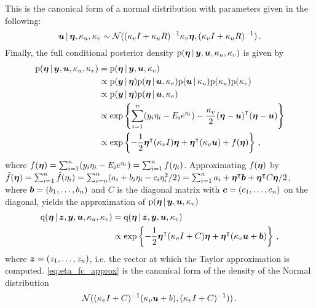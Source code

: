 %
This is the canonical form of a normal distribution with parameters given in the following:
%
\begin{equation*}
    \bm{u} \, | \, \bm{\eta}, \kappa_u, \kappa_v \sim \mathcal{N} ((\kappa_v I + \kappa_u R)^{-1} \kappa_v \bm{\eta}, (\kappa_v I + \kappa_u R)^{-1}) \, .
\end{equation*}
%
Finally, the full conditional posterior density $\mathrm{p}(\bm{\eta} \, | \, \bm{y}, \bm{u}, \kappa_u, \kappa_v)$ is given by
%
\begin{align*}
    \mathrm{p}(\bm{\eta} \, | \, \bm{y}, \bm{u}, \kappa_u, \kappa_v) &= \mathrm{p}(\bm{\eta} \, | \, \bm{y}, \bm{u}, \kappa_v) \\
    &\propto \mathrm{p}(\bm{y} \, | \, \bm{\eta}) \mathrm{p}(\bm{\eta} \, | \, \bm{u}, \kappa_v) \mathrm{p}(\bm{\bm{u}} \, | \, \kappa_u) \mathrm{p}(\kappa_u) \mathrm{p}(\kappa_v) \\
    &\propto \mathrm{p}(\bm{y} \, | \, \bm{\eta}) \mathrm{p}(\bm{\eta} \, | \, \bm{u}, \kappa_v) \\
    &\propto \exp \left\{\sum_{i=1}^n(y_i \eta_i - E_i e^{\eta_i}) - \frac{\kappa_v}{2} {(\bm{\eta} - \bm{u})}^\intercal(\bm{\eta} - \bm{u})\right\} \\
    &\propto \exp \left\{-\frac{1}{2} {\bm{\eta}}^\intercal (\kappa_v I) \bm{\eta} + {\bm{\eta}}^\intercal (\kappa_v \bm{u}) + f(\bm{\eta})\right\} \, ,
\end{align*}
%
where $f(\bm{\eta}) = \sum_{i=1}^n(y_i \eta_i - E_i e^{\eta_i}) = \sum_{i=1}^n f(\eta_i)$. Approximating $f(\bm{\eta})$ by $\Tilde{f}(\bm{\eta}) = \sum_{i=1}^n \Tilde{f}(\eta_i) = \sum_{i=n}^n (a_i + b_i \eta_i - c_i \eta_i^2 / 2) = \sum_{i=1}^n a_i + {\bm{\eta}}^\intercal \bm{b} + {\bm{\eta}}^\intercal C \bm{\eta} / 2$, where $\bm{b} = (b_1, \dots, b_n)$ and $C$ is the diagonal matrix with $\bm{c} = (c_1, \dots, c_n)$ on the diagonal, yields the approximation of $\mathrm{p}(\bm{\eta} \, | \, \bm{y}, \bm{u}, \kappa_v)$
%
\begin{align}
\label{eq:eta_fc_approx}
    \mathrm{q}(\bm{\eta} \, | \, \bm{z}, \bm{y}, \bm{u}, \kappa_u, \kappa_v) &= \mathrm{q}(\bm{\eta} \, | \, \bm{z}, \bm{y}, \bm{u}, \kappa_v) \\
    &\propto \exp \left\{-\frac{1}{2} {\bm{\eta}}^\intercal (\kappa_v I + C) \bm{\eta} + {\bm{\eta}}^\intercal (\kappa_v \bm{u} + \bm{b})\right\} \, ,
\end{align}
%
where $\bm{z} = (z_1, \dots, z_n)$, i.e. the vector at which the Taylor approximation is computed. \eqref{eq:eta_fc_approx} is the canonical form of the density of the Normal distribution
%
\begin{equation*}
    \mathcal{N} ((\kappa_v I + C)^{-1} (\kappa_v \bm{u} + b), (\kappa_v I + C)^{-1})) \, .
\end{equation*}
